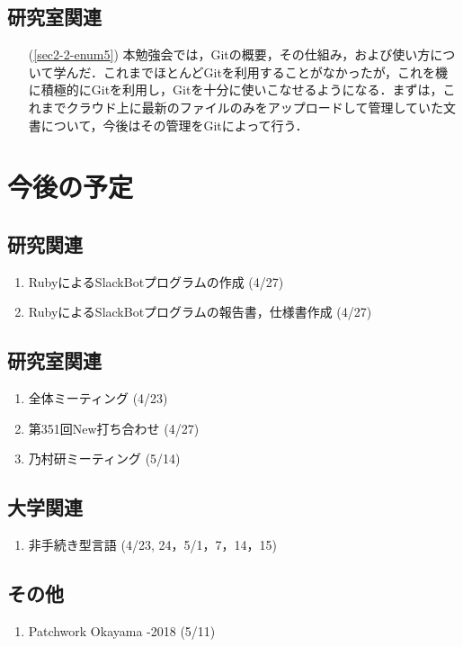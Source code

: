 \documentclass[fleqn, 14pt]{extarticle}
\begin{document}
\subsection{研究室関連}
\label{sec3-2}
\begin{itemize}
\item[(\ref{sec2-2-enum5})] 本勉強会では，Gitの概要，その仕組み，および使い方について学んだ．これまでほとんどGitを利用することがなかったが，これを機に積極的にGitを利用し，Gitを十分に使いこなせるようになる．まずは，これまでクラウド上に最新のファイルのみをアップロードして管理していた文書について，今後はその管理をGitによって行う．
\end{itemize}

\section{今後の予定}
\label{sec4}
\subsection{研究関連}
\label{sec4-1}
\begin{enumerate}
\item RubyによるSlackBotプログラムの作成
  \hfill
  \label{sec4-1-enum1}
  (4/27)
\item RubyによるSlackBotプログラムの報告書，仕様書作成
  \hfill
  \label{sec4-1-enum2}
  (4/27)
\end{enumerate}

\subsection{研究室関連}
\label{sec4-2}
\begin{enumerate}
\item 全体ミーティング
  \hfill
  \label{sec4-2-enum1}
  (4/23)
\item 第351回New打ち合わせ
  \hfill
  \label{sec4-2-enum1}
  (4/27)
\item 乃村研ミーティング
  \hfill
  \label{sec4-2-enum1}
  (5/14)
\end{enumerate}

\subsection{大学関連}
\label{sec4-3}
\begin{enumerate}
\item 非手続き型言語 
  \hfill
  \label{sec4-3-enum1}
  (4/23, 24，5/1，7，14，15)
\end{enumerate}

\subsection{その他}
\label{sec4-3}
\begin{enumerate}
\item  Patchwork Okayama -2018
  \hfill
  \label{sec4-4-enum1}
  (5/11)
\end{enumerate}

\end{document}
